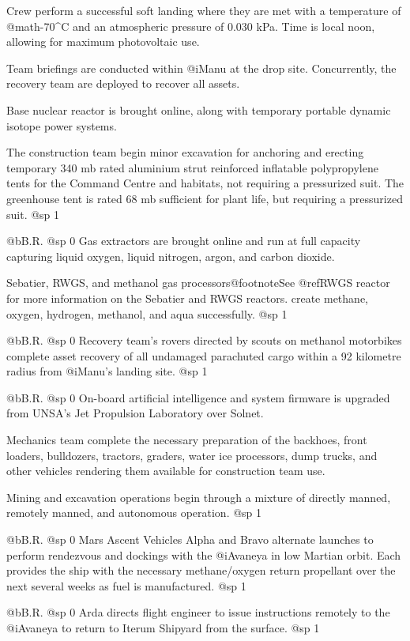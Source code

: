 Crew perform a successful soft landing where they are met with a temperature of @math{-70^{\circ}}C and an atmospheric pressure of 0.030 kPa. Time is local noon, allowing for maximum photovoltaic use.

Team briefings are conducted within @i{Manu} at the drop site. Concurrently, the recovery team are deployed to recover all assets.

Base nuclear reactor is brought online, along with temporary portable dynamic isotope power systems.

The construction team begin minor excavation for anchoring and erecting temporary 340 mb rated aluminium strut reinforced inflatable polypropylene tents for the Command Centre and habitats, not requiring a pressurized suit. The greenhouse tent is rated 68 mb sufficient for plant life, but requiring a pressurized suit.
@sp 1

@b{B.R.}
@sp 0
Gas extractors are brought online and run at full capacity capturing liquid oxygen, liquid nitrogen, argon, and carbon dioxide. 

Sebatier, RWGS, and methanol gas processors@footnote{See @ref{RWGS reactor} for more information on the Sebatier and RWGS reactors.} create methane, oxygen, hydrogen, methanol, and aqua successfully.
@sp 1

@b{B.R.}
@sp 0
Recovery team's rovers directed by scouts on methanol motorbikes complete asset recovery of all undamaged parachuted cargo within a 92 kilometre radius from @i{Manu's} landing site.
@sp 1

@b{B.R.}
@sp 0
On-board artificial intelligence and system firmware is upgraded from UNSA's Jet Propulsion Laboratory over Solnet.

Mechanics team complete the necessary preparation of the backhoes, front loaders, bulldozers, tractors, graders, water ice processors, dump trucks, and other vehicles rendering them available for construction team use.

Mining and excavation operations begin through a mixture of directly manned, remotely manned, and autonomous operation.
@sp 1

@b{B.R.}
@sp 0
Mars Ascent Vehicles Alpha and Bravo alternate launches to perform rendezvous and dockings with the @i{Avaneya} in low Martian orbit. Each provides the ship with the necessary methane/oxygen return propellant over the next several weeks as fuel is manufactured.
@sp 1

@b{B.R.}
@sp 0
Arda directs flight engineer to issue instructions remotely to the @i{Avaneya} to return to Iterum Shipyard from the surface.
@sp 1

